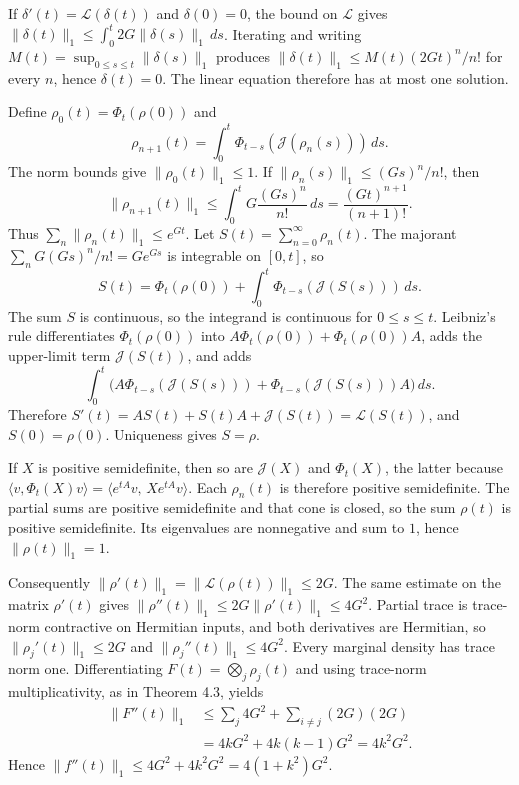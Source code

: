 \documentclass[
  11pt,
]{article}
\begin{document}
If \(\delta'(t)=\mathcal L(\delta(t))\) and \(\delta(0)=0\), the bound on
\(\mathcal L\) gives
\(\|\delta(t)\|_1\le\int_0^t 2G\|\delta(s)\|_1\,ds\). Iterating and
writing \(M(t)=\sup_{0\le s\le t}\|\delta(s)\|_1\) produces
\(\|\delta(t)\|_1\le M(t)(2Gt)^n/n!\) for every \(n\), hence
\(\delta(t)=0\). The linear equation therefore has at most one
solution.

Define \(\rho_0(t)=\Phi_t(\rho(0))\) and
\[
\rho_{n+1}(t)
=\int_0^t\Phi_{t-s}(\mathcal J(\rho_n(s)))\,ds.
\]
The norm bounds give \(\|\rho_0(t)\|_1\le 1\). If
\(\|\rho_n(s)\|_1\le (Gs)^n/n!\), then
\[
\|\rho_{n+1}(t)\|_1
\le\int_0^t G\frac{(Gs)^n}{n!}\,ds
=\frac{(Gt)^{n+1}}{(n+1)!}.
\]
Thus \(\sum_n\|\rho_n(t)\|_1\le e^{Gt}\). Let
\(S(t)=\sum_{n=0}^\infty\rho_n(t)\). The majorant
\(\sum_n G(Gs)^n/n!=Ge^{Gs}\) is integrable on \([0,t]\), so
\[
S(t)
=\Phi_t(\rho(0))
+\int_0^t\Phi_{t-s}(\mathcal J(S(s)))\,ds.
\]
The sum \(S\) is continuous, so the integrand is continuous for
\(0\le s\le t\). Leibniz's rule differentiates
\(\Phi_t(\rho(0))\) into \(A\Phi_t(\rho(0))+\Phi_t(\rho(0))A\), adds the
upper-limit term \(\mathcal J(S(t))\), and adds
\[
\int_0^t
\bigl(
A\Phi_{t-s}(\mathcal J(S(s)))
+\Phi_{t-s}(\mathcal J(S(s)))A
\bigr)\,ds.
\]
Therefore
\(S'(t)=AS(t)+S(t)A+\mathcal J(S(t))=\mathcal L(S(t))\), and
\(S(0)=\rho(0)\). Uniqueness gives \(S=\rho\).

If \(X\) is positive semidefinite, then so are \(\mathcal J(X)\) and
\(\Phi_t(X)\), the latter because
\(\langle v,\Phi_t(X)v\rangle=\langle e^{tA}v,\,X e^{tA}v\rangle\).
Each \(\rho_n(t)\) is therefore positive semidefinite. The partial sums
are positive semidefinite and that cone is closed, so the sum
\(\rho(t)\) is positive semidefinite. Its eigenvalues are nonnegative
and sum to \(1\), hence \(\|\rho(t)\|_1=1\).

Consequently \(\|\rho'(t)\|_1=\|\mathcal L(\rho(t))\|_1\le 2G\).
The same estimate on the matrix \(\rho'(t)\) gives
\(\|\rho''(t)\|_1\le 2G\|\rho'(t)\|_1\le 4G^2\). Partial trace is
trace-norm contractive on Hermitian inputs, and both derivatives are
Hermitian, so \(\|\rho_j'(t)\|_1\le 2G\) and
\(\|\rho_j''(t)\|_1\le 4G^2\). Every marginal density has trace norm
one. Differentiating \(F(t)=\bigotimes_j\rho_j(t)\) and using
trace-norm multiplicativity, as in Theorem 4.3, yields
\[
\begin{aligned}
\|F''(t)\|_1
&\le\sum_j 4G^2+\sum_{i\ne j}(2G)(2G)\\
&=4kG^2+4k(k-1)G^2=4k^2G^2.
\end{aligned}
\]
Hence \(\|f''(t)\|_1\le 4G^2+4k^2G^2=4(1+k^2)G^2\).
\end{document}
